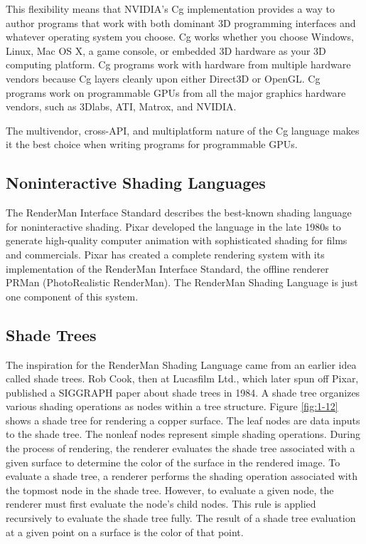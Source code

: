\documentclass{book}
\begin{document}
This flexibility means that NVIDIA's Cg implementation provides a way to author programs that work with both dominant 3D programming interfaces and whatever operating system you choose. Cg works whether you choose Windows, Linux, Mac OS X, a game console, or embedded 3D hardware as your 3D computing platform. Cg programs work with hardware from multiple hardware vendors because Cg layers cleanly upon either Direct3D or OpenGL. Cg programs work on programmable GPUs from all the major graphics hardware vendors, such as 3Dlabs, ATI, Matrox, and NVIDIA.

The multivendor, cross-API, and multiplatform nature of the Cg language makes it the best choice when writing programs for programmable GPUs.

\subsection{Noninteractive Shading Languages}

The RenderMan Interface Standard describes the best-known shading language for noninteractive shading. Pixar developed the language in the late 1980s to generate high-quality computer animation with sophisticated shading for films and commercials. Pixar has created a complete rendering system with its implementation of the RenderMan Interface Standard, the offline renderer PRMan (PhotoRealistic RenderMan). The RenderMan Shading Language is just one component of this system.

\subsection*{Shade Trees}

The inspiration for the RenderMan Shading Language came from an earlier idea called shade trees. Rob Cook, then at Lucasfilm Ltd., which later spun off Pixar, published a SIGGRAPH paper about shade trees in 1984. A shade tree organizes various shading operations as nodes within a tree structure. Figure \ref{fig:1-12} shows a shade tree for rendering a copper surface. The leaf nodes are data inputs to the shade tree. The nonleaf nodes represent simple shading operations. During the process of rendering, the renderer evaluates the shade tree associated with a given surface to determine the color of the surface in the rendered image. To evaluate a shade tree, a renderer performs the shading operation associated with the topmost node in the shade tree. However, to evaluate a given node, the renderer must first evaluate the node's child nodes. This rule is applied recursively to evaluate the shade tree fully. The result of a shade tree evaluation at a given point on a surface is the color of that point.
\end{document}
